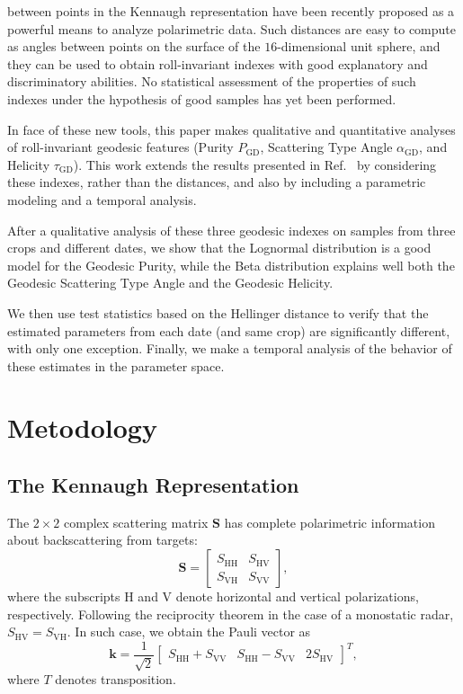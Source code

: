 \documentclass[journal]{IEEEtran}
\begin{document}
 between points in the Kennaugh representation have been recently proposed as a powerful means to analyze polarimetric data.
Such distances are easy to compute as angles between points on the surface of the $16$-dimensional unit sphere, and they can be used to obtain roll-invariant indexes with good explanatory and discriminatory abilities.
No statistical assessment of the properties of such indexes under the hypothesis of good samples has yet been performed.

In face of these new tools, this paper makes qualitative and quantitative analyses of roll-invariant geodesic features (Purity $P_{\text{GD}}$, Scattering Type Angle $\alpha_{\text{GD}}$, and Helicity $\tau_{\text{GD}}$).
This work extends the results presented in Ref.~\cite{StatisticalPropertiesofGeodesicDistancesBetweenSamplesandElementaryScatterersinPolSARImagery2019} by considering these indexes, rather than the distances, and also by including a parametric modeling and a temporal analysis.

After a qualitative analysis of these three geodesic indexes on samples from three crops and different dates, we show that the Lognormal distribution is a good model for the Geodesic Purity, while the Beta distribution explains well both the Geodesic Scattering Type Angle and the Geodesic Helicity.

We then use test statistics based on the Hellinger distance to verify that the estimated parameters from each date (and same crop) are significantly different, with only one exception.
Finally, we make a temporal analysis of the behavior of these estimates in the parameter space.

\section{Metodology}

\subsection{The Kennaugh Representation}

The $2 \times 2$ complex scattering matrix $\bm S$ has
complete polarimetric information about backscattering
from targets:
$$
\bm S = \begin{bmatrix}
S_{\text{HH}} &S_{\text{HV}}\\
S_{\text{VH}} &S_{\text{VV}}
\end{bmatrix},
$$
where the subscripts $\text{H}$ and $\text{V}$ denote horizontal and vertical
polarizations, respectively. 
Following the reciprocity theorem
in the case of a monostatic radar, 
$S_{\text{HV}}=S_{\text{VH}}$.
In such case, we obtain the Pauli vector as
$$
\bm k = \frac1{\sqrt{2}}
	\begin{bmatrix}
S_{\text{HH}} + S_{\text{VV}} 
& S_{\text{HH}} - S_{\text{VV}} 
& 2S_{\text{HV}}
	\end{bmatrix}^T,
$$
where $T$ denotes transposition.
\end{document}
